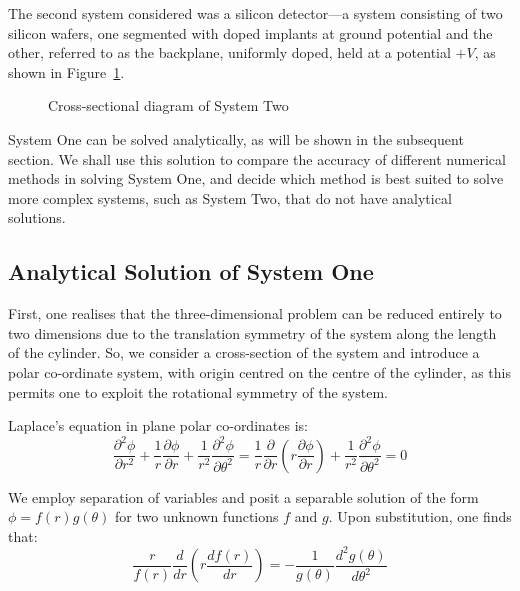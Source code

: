 \documentclass[11pt, a4paper]{article}
\newcommand{\be}{\begin{equation}}
\newcommand{\ee}{\end{equation}}
\begin{document}
The second system considered was a silicon detector---a system consisting of two
silicon wafers, one segmented with doped implants at ground potential and the other,
referred to as the backplane, uniformly doped, held at a potential $+V$, as shown
in Figure~\ref{fig:sys two}.

\begin{figure}[h!]
\begin{center}
\end{center}
\caption{Cross-sectional diagram of System Two}
\label{fig:sys two}
\end{figure}

System One can be solved analytically, as will be shown in the subsequent section. We
shall use this solution to compare the accuracy of different numerical methods in solving
System One, and decide which method is best suited to solve more complex systems, such
as System Two, that do not have analytical solutions.

\subsection{Analytical Solution of System One}

First, one realises that the three-dimensional problem can be reduced entirely to two
dimensions due to the translation symmetry of the system along the length of the
cylinder. So, we consider a cross-section of the system and introduce a polar
co-ordinate system, with origin centred on the centre of the cylinder, as this permits
one to exploit the rotational symmetry of the system.

Laplace's equation in plane polar co-ordinates is: 
%
\be
\frac{\partial^2 \phi}{\partial r^2}+\frac{1}{r}\frac{\partial \phi}{\partial r}+\frac{1}{r^2}\frac{\partial^2 \phi}{\partial \theta^2}
= \frac{1}{r}\frac{\partial}{\partial r}(r \frac{\partial \phi}{\partial r}) + \frac{1}{r^2}\frac{\partial ^2 \phi}{\partial \theta^2}
= 0
\ee

We employ separation of variables and posit a separable solution of the form
$\phi = f(r)g(\theta)$ for two unknown functions $f$ and $g$. Upon substitution,
one finds that:
%
\be
\frac{r}{f(r)}\frac{d}{dr}(r \frac{df(r)}{dr}) =- \frac{1}{g(\theta)}\frac{d^2 g(\theta)}{d\theta^2}
\ee
\end{document}
